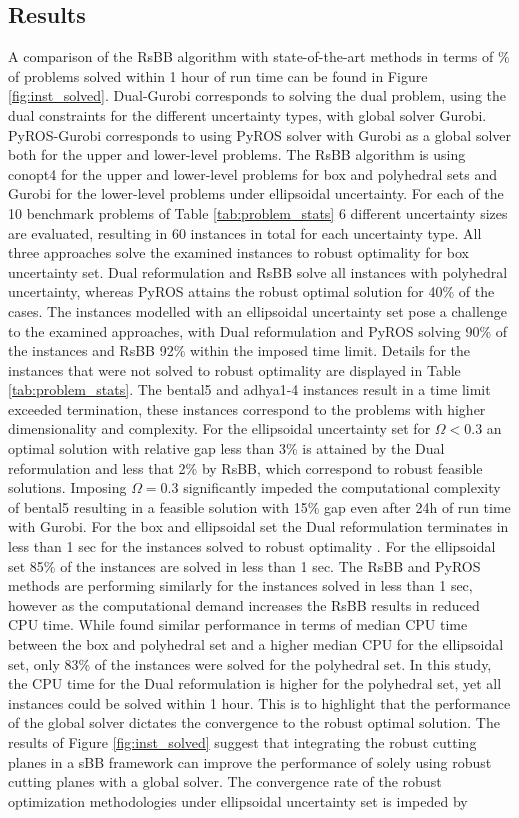 \documentclass[sn-mathphys-num]{sn-jnl}
\begin{document}
\subsection{Results}
A comparison of the RsBB algorithm with state-of-the-art methods in terms of \% of problems solved within 1 hour of run time can be found in Figure \ref{fig:inst_solved}. Dual-Gurobi corresponds to solving the dual problem, using the dual constraints for the different uncertainty types, with global solver Gurobi. PyROS-Gurobi corresponds to using PyROS solver with Gurobi as a global solver both for the upper and lower-level problems. The RsBB algorithm is using conopt4 for the upper and lower-level problems for box and polyhedral sets and Gurobi for the lower-level problems under ellipsoidal uncertainty. For each of the 10 benchmark problems of Table \ref{tab:problem_stats} 6 different uncertainty sizes are evaluated, resulting in 60 instances in total for each uncertainty type. All three approaches solve the examined instances to robust optimality for box uncertainty set. Dual reformulation and RsBB solve all instances with polyhedral uncertainty, whereas PyROS attains the robust optimal solution for 40\% of the cases. The instances modelled with an ellipsoidal uncertainty set pose a challenge to the examined approaches, with Dual reformulation and PyROS solving 90\% of the instances and RsBB 92\% within the imposed time limit. Details for the instances that were not solved to robust optimality are displayed in Table \ref{tab:problem_stats}. The bental5 and adhya1-4 instances result in a time limit exceeded termination, these instances correspond to the problems with higher dimensionality and complexity. For the ellipsoidal uncertainty set for $\Omega<0.3$ an optimal solution with relative gap less than 3\% is attained by the Dual reformulation and less that 2\% by RsBB, which correspond to robust feasible solutions. Imposing $\Omega=0.3$ significantly impeded the computational complexity of bental5 resulting in a feasible solution with 15\% gap even after 24h of run time with Gurobi. For the box and ellipsoidal set the Dual reformulation terminates in less than 1 sec for the instances solved to robust optimality . For the ellipsoidal set 85\% of the instances are solved in less than 1 sec. The RsBB and PyROS methods are performing similarly for the instances solved in  less than 1 sec, however as the computational demand increases the RsBB results in reduced CPU time. While \citep{Wiebe2019} found similar performance in terms of median CPU time between the box and polyhedral set and a higher median CPU for the ellipsoidal set, only 83\% of the instances were solved for the polyhedral set. In this study, the CPU time for the Dual reformulation is higher for the polyhedral set, yet all instances could be solved within 1 hour. This is to highlight that the performance of the global solver dictates the convergence to the robust optimal solution. The results of Figure \ref{fig:inst_solved} suggest that integrating the robust cutting planes in a sBB framework can improve the performance of solely using robust cutting planes with a global solver. The convergence rate of the robust optimization methodologies under ellipsoidal uncertainty set is impeded by 
\end{document}

